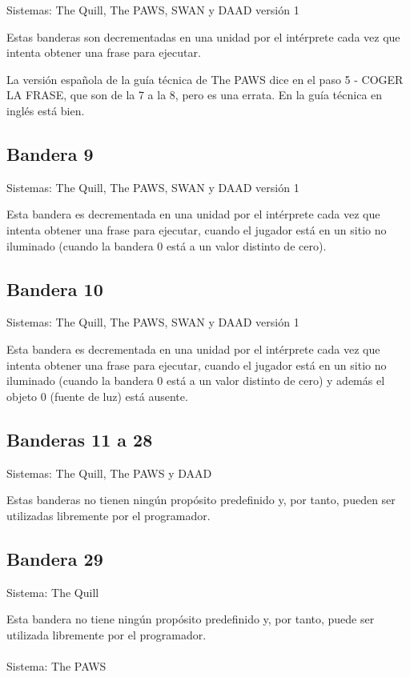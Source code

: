 \documentclass[11pt, a5paper]{article}
\newcommand{\quill}{\textsf{The Quill}\xspace}
\newcommand{\paw}{\textsf{The PAWS}\xspace}
\newcommand{\swan}{\textsf{SWAN}\xspace}
\newcommand{\daad}{\textsf{DAAD}\xspace}
\newcommand{\sistema}[1]{\noindent Sistema: #1 \nopagebreak}
\newcommand{\sistemas}[1]{\noindent Sistemas: #1 \nopagebreak}
\begin{document}
\sistemas{\quill, \paw, \swan y \daad versión 1}

Estas banderas son decrementadas en una unidad por el intérprete cada vez que intenta obtener una frase para ejecutar.

La versión española de la guía técnica de \paw dice en el paso 5 - COGER LA FRASE, que son de la 7 a la 8, pero es una errata. En la guía técnica en inglés \cite{PawsPC} está bien.

\subsection{Bandera 9}

\sistemas{\quill, \paw, \swan y \daad versión 1}

Esta bandera es decrementada en una unidad por el intérprete cada vez que intenta obtener una frase para ejecutar, cuando el jugador está en un sitio no iluminado (cuando la bandera 0 está a un valor distinto de cero).

\subsection{Bandera 10}

\sistemas{\quill, \paw, \swan y \daad versión 1}

Esta bandera es decrementada en una unidad por el intérprete cada vez que intenta obtener una frase para ejecutar, cuando el jugador está en un sitio no iluminado (cuando la bandera 0 está a un valor distinto de cero) y además el objeto 0 (fuente de luz) está ausente.

\subsection{Banderas 11 a 28}

\sistemas{\quill, \paw y \daad}

Estas banderas no tienen ningún propósito predefinido y, por tanto, pueden ser utilizadas libremente por el programador.

\subsection{Bandera 29}\label{flag29}

\sistema{\quill}

Esta bandera no tiene ningún propósito predefinido y, por tanto, puede ser utilizada libremente por el programador.
\\\ \\
\sistema{\paw}
\end{document}
